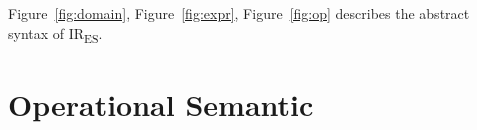 \documentclass[acmsmall,screen]{acmart}
\newcommand{\irname}[0]{IR\textsubscript{ES}\xspace}
\newcommand{\Acd}[1]{\mathsf{#1}}
\newcommand{\Cd}[1]{\texttt{#1}}
\newcommand{\primitive}[1]{ \Cd{#1}}
\newcommand{\uexpr}[2]{\primitive{#1} #2}
\newcommand{\ibexpr}[3]{#2 \primitive{#1} #3}
\newcommand{\prebexpr}[3]{\primitive{#1} #2 #3}
\begin{document}








Figure~\ref{fig:domain}, Figure~\ref{fig:expr}, Figure~\ref{fig:op}
describes the abstract syntax of \irname.

\section{Operational Semantic}
\end{document}
